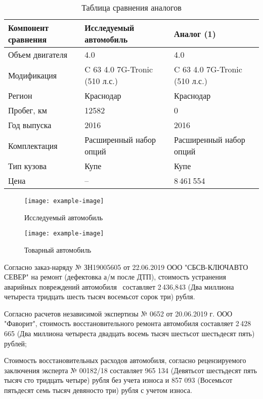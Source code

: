     \begin{longtable}{|p{51mm}|p{51mm}|p{51mm}|}
  	\caption[]{\footnotesize {Таблица сравнения аналогов}} \label{tab:11}\\ 
  	\hline
  	\rowcolor[HTML]{EFEFEF} 
  	Компонент сравнения & Исследуемый автомобиль& Аналог (1)  \\ \hline \endhead %
  	Объем двигателя  &4.0 & 4.0 \\ \hline
 	Модификация  &C 63 4.0 7G-Tronic (510 л.с.)  & C 63 4.0 7G-Tronic (510 л.с.)\\ \hline
  	Регион  & Краснодар  & Краснодар\\ \hline
  	Пробег, км & 12582  & 0\\ \hline
  	Год выпуска  & 2016  & 2016 \\ \hline
  	Комплектация  & Расширенный набор опций  & Расширенный набор опций \\ \hline
  	Тип кузова  & Купе  & Купе \\ \hline
  	Цена  &  -- & 8\,461\,554 \\ \hline
  \end{longtable}
  
      \begin{figure}[h!]\centering
  	\parbox[t]{0.49\textwidth}
  	{\centering
  		\texttt{[image: example-image]}
  		\caption{\footnotesize {Исследуемый автомобиль}}
  		\label{}}
  	\hfil \hfil%
  	\parbox[t]{0.49\textwidth}
  	{\centering
  		\texttt{[image: example-image]}
  		\caption{\footnotesize {Товарный автомобиль}}
  		\label{ris:images/is}}
  \end{figure}
  
\par Согласно заказ-наряду № ЗН19005605 от 22.06.2019 ООО "СБСВ-КЛЮЧАВТО СЕВЕР" на ремонт (дефектовка а/м после ДТП), стоимость устранения аварийных повреждений автомобиля  \, составляет 2\,436,843 (Два миллиона четыреста тридцать шесть тысяч восемьсот сорок три) рубля. 
\par Согласно расчетов независимой экспертизы  № 0652 от 20.06.2019 г. ООО "Фаворит", стоимость восстановительного ремонта автомобиля составляет 2\,428\,665 (Два миллиона четыреста двадцать восемь тысяч шестьсот шестьдесят пять) рублей;
\par Стоимость восстановительных расходов автомобиля, согласно рецензируемого  заключения эксперта № 00182/18  составляет 965 134 (Девятьсот шестьдесят пять тысяч сто тридцать четыре) рубля без учета износа и 857 093 (Восемьсот пятьдесят семь тысяч девяносто три) рубля с учетом износа.

